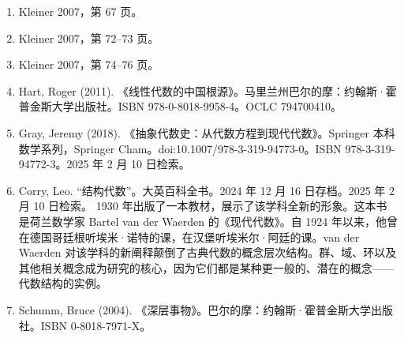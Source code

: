 \begin{enumerate}
\item Kleiner 2007，第 67 页。
\item Kleiner 2007，第 72–73 页。
\item Kleiner 2007，第 74–76 页。
\item Hart, Roger (2011). 《线性代数的中国根源》。马里兰州巴尔的摩：约翰斯·霍普金斯大学出版社。ISBN 978-0-8018-9958-4。OCLC 794700410。
\item Gray, Jeremy (2018). 《抽象代数史：从代数方程到现代代数》。Springer 本科数学系列，Springer Cham。doi:10.1007/978-3-319-94773-0。ISBN 978-3-319-94772-3。2025 年 2 月 10 日检索。
\item Corry, Leo. “结构代数”。大英百科全书。2024 年 12 月 16 日存档。2025 年 2 月 10 日检索。
    1930 年出版了一本教材，展示了该学科全新的形象。这本书是荷兰数学家 Bartel van der Waerden 的《现代代数》。自 1924 年以来，他曾在德国哥廷根听埃米·诺特的课，在汉堡听埃米尔·阿廷的课。van der Waerden 对该学科的新阐释颠倒了古典代数的概念层次结构。群、域、环以及其他相关概念成为研究的核心，因为它们都是某种更一般的、潜在的概念——代数结构的实例。
\item Schumm, Bruce (2004). 《深层事物》。巴尔的摩：约翰斯·霍普金斯大学出版社。ISBN 0-8018-7971-X。
\end{enumerate}